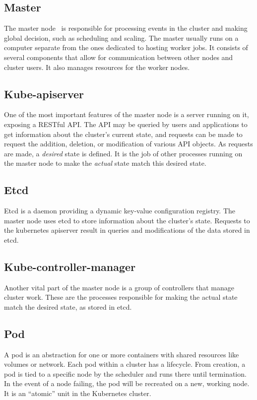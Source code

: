 \subsection{Master}
The master node~\cite{master-node} is responsible for processing events in the
cluster and making global decision, such as scheduling and scaling. The master
usually runs on a computer separate from the ones dedicated to hosting worker
jobs. It consists of several components that allow for communication between
other nodes and cluster users. It also manages resources for the worker nodes.

\subsection{Kube-apiserver}
One of the most important features of the master node is a server running on it,
exposing a RESTful API. The API may be queried by users and applications to get
information about the cluster’s current state, and requests can be made to
request the addition, deletion, or modification of various API objects. As
requests are made, a \emph{desired} state is defined. It is the job of other
processes running on the master node to make the \emph{actual} state match this
desired state.

\subsection{Etcd}
Etcd is a daemon providing a dynamic key-value configuration registry. The
master node uses etcd to store information about the cluster’s state. Requests
to the kubernetes apiserver result in queries and modifications of the data
stored in etcd.

\subsection{Kube-controller-manager}
Another vital part of the master node is a group of controllers that manage
cluster work. These are the processes responsible for making the actual state
match the desired state, as stored in etcd.

\subsection{Pod}
A pod is an abstraction for one or more containers with shared resources like
volumes or network. Each pod within a cluster has a lifecycle. From creation,
a pod is tied to a specific node by the scheduler and runs there until
termination. In the event of a node failing, the pod will be recreated on a new,
working node. It is an “atomic” unit in the Kubernetes cluster.

